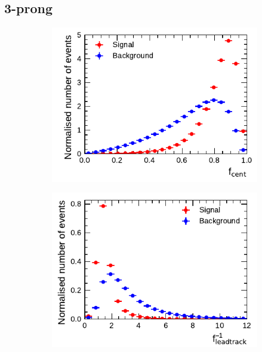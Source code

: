 
\clearpage
\subsection{3-prong}

\begin{figure}[!ht]
  \begin{subfigure}{0.5\textwidth}
    \centering
    \includegraphics{./figures/baseline_bdt_vars/3p/centFrac.pdf}
  \end{subfigure}%
  \begin{subfigure}{0.5\textwidth}
    \centering
    \includegraphics{./figures/baseline_bdt_vars/3p/etOverPtLeadTrk.pdf}
  \end{subfigure}
  \begin{subfigure}{0.5\textwidth}
    \centering

\end{subfigure}
\end{figure}
